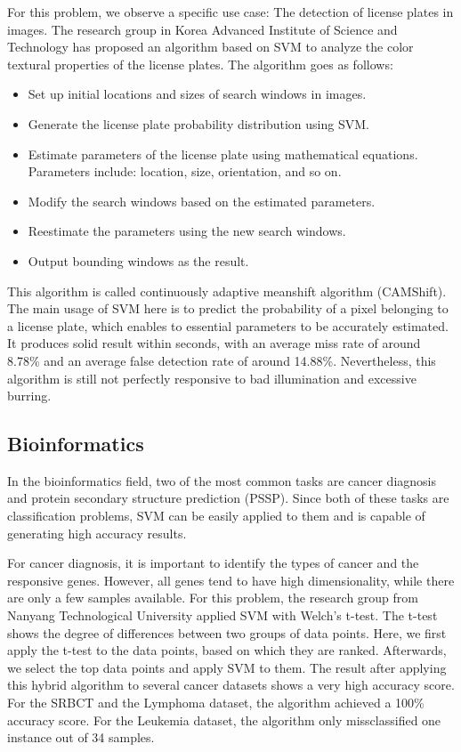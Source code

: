 For this problem, we observe a specific use case: The detection of
license plates in images. The research group in Korea Advanced Institute of 
Science and Technology has proposed an algorithm based on SVM to analyze the 
color textural properties of the license plates. The algorithm goes as
follows:

\begin{itemize}
    \item Set up initial locations and sizes of search windows in images.
    \item Generate the license plate probability distribution using SVM.
    \item Estimate parameters of the license plate using mathematical equations.
    Parameters include: location, size, orientation, and so on.
    \item Modify the search windows based on the estimated parameters.
    \item Reestimate the parameters using the new search windows.
    \item Output bounding windows as the result.
\end{itemize}

This algorithm is called continuously adaptive meanshift algorithm (CAMShift).
The main usage of SVM here is to predict the probability of a pixel belonging
to a license plate, which enables to essential parameters to be accurately estimated.
It produces solid result within seconds, with an average miss rate of around
8.78\% and an average false detection rate of around 14.88\%.
Nevertheless, this algorithm is still not perfectly responsive to bad illumination
and excessive burring.
\cite{image-classification}

\subsection*{Bioinformatics}
In the bioinformatics field, two of the most common tasks are cancer
diagnosis and protein secondary structure prediction (PSSP). Since both of these
tasks are classification problems, SVM can be easily applied to them and is
capable of generating high accuracy results.

For cancer diagnosis, it is important to identify the types of cancer and the
responsive genes. However, all genes tend to have high dimensionality, while 
there are only a few samples available. For this problem, the research group
from Nanyang Technological University applied SVM with Welch's t-test.
The t-test shows the degree of differences between two groups of data points.
Here, we first apply the t-test to the data points, based on which they are 
ranked. Afterwards, we select the top data points and apply SVM to them.
The result after applying this hybrid algorithm to several cancer datasets 
shows a very high accuracy score. For the SRBCT and the Lymphoma dataset, the
algorithm achieved a 100\% accuracy score. For the Leukemia dataset, the
algorithm only missclassified one instance out of 34 samples.

